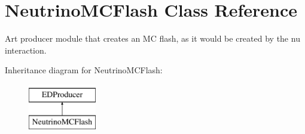 \hypertarget{classNeutrinoMCFlash}{\section{Neutrino\-M\-C\-Flash Class Reference}
\label{classNeutrinoMCFlash}
}


Art producer module that creates an M\-C flash, as it would be created by the nu interaction.  


Inheritance diagram for Neutrino\-M\-C\-Flash\-:\begin{figure}[H]
\begin{center}
\leavevmode
\includegraphics[height=2.000000cm]{classNeutrinoMCFlash}
\end{center}
\end{figure}
